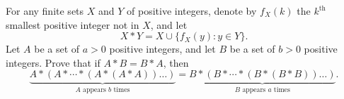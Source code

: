 For any finite sets $X$ and $Y$ of positive integers, denote by $f_X(k)$ the $k^{\text{th}}$ smallest positive integer not in $X$, and let
\[ X * Y = X \cup \{ f_X(y) : y \in Y \}. \]
Let $A$ be a set of $a > 0$ positive integers, and let $B$ be a set of $b > 0$ positive integers. Prove that if $A * B = B * A$, then
\[ \underbrace{A * (A * \cdots * (A * (A * A)) \ldots)}_{A \text{ appears } b \text{ times}} = \underbrace{B * (B * \cdots * (B * (B * B)) \ldots)}_{B \text{ appears } a \text{ times}}. \]
